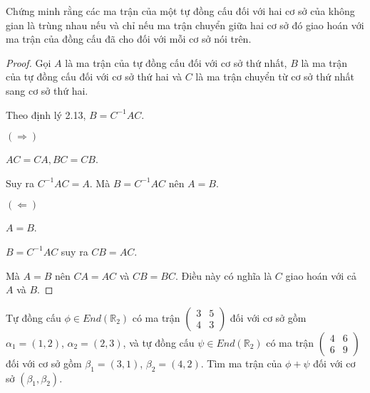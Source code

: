 \documentclass[class=linearalgebra,crop=false]{standalone}
\begin{document}
\begin{exercise}
    Chứng minh rằng các ma trận của một tự đồng cấu đối với hai cơ sở của không gian là trùng nhau nếu và chỉ nếu ma trận chuyển giữa hai cơ sở đó giao hoán với ma trận của đồng cấu đã cho đối với mỗi cơ sở nói trên.
\end{exercise}

\begin{proof}
    Gọi $A$ là ma trận của tự đồng cấu đối với cơ sở thứ nhất, $B$ là ma trận của tự đồng cấu đối với cơ sở thứ hai và $C$ là ma trận chuyển từ cơ sở thứ nhất sang cơ sở thứ hai.
    \par Theo định lý 2.13, $B = C^{-1}AC$.
    \par $(\Rightarrow)$
    \par $AC = CA, BC = CB$.
    \par Suy ra $C^{-1}AC = A$. Mà $B = C^{-1}AC$ nên $A = B$.
    \par $(\Leftarrow)$
    \par $A = B$.
    \par $B = C^{-1}AC$ suy ra $CB = AC$.
    \par Mà $A = B$ nên $CA = AC$ và $CB = BC$. Điều này có nghĩa là $C$ giao hoán với cả $A$ và $B$.
\end{proof}

\begin{exercise}
    Tự đồng cấu $\phi\in End(\mathbb{R}_{2})$ có ma trận $\begin{pmatrix}3 & 5 \\ 4 & 3\end{pmatrix}$ đối với cơ sở gồm $\alpha_{1} = (1, 2)$, $\alpha_{2} = (2, 3)$, và tự đồng cấu $\psi\in End(\mathbb{R}_{2})$ có ma trận $\begin{pmatrix}4 & 6 \\ 6 & 9 \end{pmatrix}$ đối với cơ sở gồm $\beta_{1} = (3, 1)$, $\beta_{2} = (4, 2)$. Tìm ma trận của $\phi + \psi$ đối với cơ sở $(\beta_{1}, \beta_{2})$.
\end{exercise}
\end{document}
